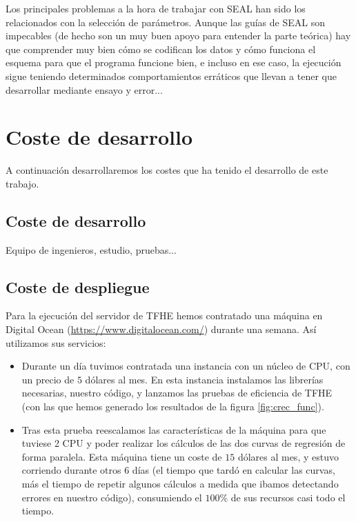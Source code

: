 Los principales problemas a la hora de trabajar con SEAL han sido los relacionados con la selección de parámetros. Aunque las guías de SEAL son impecables (de hecho son un muy buen apoyo para entender la parte teórica) hay que comprender muy bien cómo se codifican los datos y cómo funciona el esquema para que el programa funcione bien, e incluso en ese caso, la ejecución sigue teniendo determinados comportamientos erráticos que llevan a tener que desarrollar mediante ensayo y error...

\section{Coste de desarrollo}

A continuación desarrollaremos los costes que ha tenido el desarrollo de este trabajo.

\subsection{Coste de desarrollo}

Equipo de ingenieros, estudio, pruebas...


\subsection{Coste de despliegue}


Para la ejecución del servidor de TFHE hemos contratado una máquina en Digital Ocean (\url{https://www.digitalocean.com/}) durante una semana. Así utilizamos sus servicios:

\begin{itemize}
    \item Durante un día tuvimos contratada una instancia con un núcleo de CPU, con un precio de $5$ dólares al mes.
    En esta instancia instalamos las librerías necesarias, nuestro código, y lanzamos las pruebas de eficiencia de TFHE (con las que hemos generado los resultados de la figura \ref{fig:crec_func}).
    \item Tras esta prueba reescalamos las características de la máquina para que tuviese 2 CPU y poder realizar los cálculos de las dos curvas de regresión de forma paralela. Esta máquina tiene un coste de $15$ dólares al mes, y estuvo corriendo durante otros 6 días (el tiempo que tardó en calcular las curvas, más el tiempo de repetir algunos cálculos a medida que ibamos detectando errores en nuestro código), consumiendo el $100\%$ de sus recursos casi todo el tiempo.
\end{itemize}

